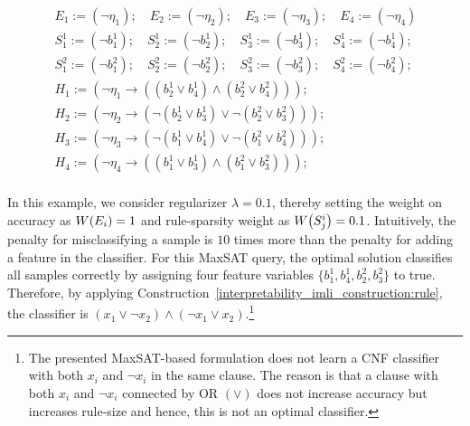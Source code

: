 \[
\begin{split}
&E_1:= (\neg \eta_1); \quad
E_2:= (\neg \eta_2); \quad E_3:= (\neg \eta_3); \quad
E_4:= (\neg \eta_4)\\
& S_1^1 := (\neg b_1^1);\quad 
 S^1_2 := (\neg b^1_2);\quad 
 S^1_3 := (\neg b^1_3);\quad
 S^1_4 := (\neg b^1_4);\quad \\ 
& S_1^2 := (\neg b_1^2);\quad 
S^2_2 := (\neg b^2_2);\quad 
S^2_3 := (\neg b^2_3);\quad 
S^2_4 := (\neg b^2_4);\quad\\ 
& H_1:= (\neg \eta_1 \rightarrow ((b_2^1 \vee b_4^1)\wedge (b_2^2 \vee b_4^2)));\\
& H_2:= (\neg \eta_2 \rightarrow (\neg(b_2^1 \vee b_3^1) \vee \neg(b_2^2 \vee b_3^2)));\\
& H_3:= (\neg \eta_3 \rightarrow (\neg (b_1^1 \vee b_4^1) \vee \neg(b_1^2 \vee b_4^2)));\\
& H_4:= (\neg \eta_4 \rightarrow ((b_1^1 \vee b_3^1) \wedge (b_1^2 \vee b_3^2)));\\
\end{split}
\]

In this example, we consider regularizer $ \lambda = 0.1 $, thereby setting the weight on accuracy as $ W \! \left( E_i \right) = 1 $ and rule-sparsity weight as $ W \! \left( S_j^i \right) = 0.1 $. Intuitively, the penalty for misclassifying a sample is $ 10 $ times more than the penalty for adding a feature in the classifier. For this MaxSAT query, the optimal solution classifies all samples correctly by assigning four feature variables $ \{b^1_1, b^1_4, b^2_2, b^2_3\} $ to true. Therefore, by applying Construction~\ref{interpretability_imli_construction:rule}, the classifier is $ (x_1 \vee \neg x_2)  \wedge (\neg x_1 \vee x_2) $.\footnote{The presented MaxSAT-based formulation does not learn a CNF classifier with both $ x_i $ and $ \neg x_i $ in the same clause. The reason is that a clause with both $ x_i $ and $ \neg x_i $ connected by OR $ (\vee) $ does not increase accuracy but increases rule-size and hence, this is not an optimal classifier.}
	
	
	
